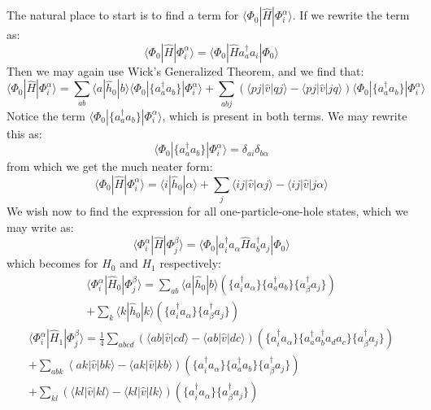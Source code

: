 \documentclass{article}
\begin{document}
\section{}
The natural place to start is to find a term for $\langle \Phi_0 | \hat H | \Phi_i^\alpha \rangle$. If we rewrite the term as:
\begin{equation*}
    \langle \Phi_0 | \hat H | \Phi_i^\alpha \rangle = \langle \Phi_0 | \hat H a_a^\dagger a_i | \Phi_0 \rangle
\end{equation*}
Then we may again use Wick's Generalized Theorem, and we find that:
\begin{equation*}
    \langle \Phi_0 | \hat H | \Phi_i^\alpha \rangle = \sum_{ab} \langle a | \hat h_0 | b \rangle \langle \Phi_0 | \{ a_a^\dagger a_b \} | \Phi_i^\alpha \rangle + \sum_{abj} (\langle pj | \hat v | q j \rangle - \langle pj | \hat v | jq \rangle) \langle \Phi_0 | \{ a_a^\dagger a_b \} | \Phi_i^\alpha \rangle
\end{equation*}
Notice the term $\langle \Phi_0 | \{ a_a^\dagger a_b \} | \Phi_i^\alpha \rangle$, which is present in both terms. We may rewrite this as:
\begin{equation*}
    \langle \Phi_0 | \{ a_a^\dagger a_b \} | \Phi_i^\alpha \rangle = \delta_{ai} \delta_{b \alpha}
\end{equation*}
from which we get the much neater form:
\begin{equation}
    \langle \Phi_0 | \hat H | \Phi_i^\alpha \rangle = \langle i | \hat h_0 | \alpha \rangle + \sum_j \langle ij | \hat v | \alpha j \rangle - \langle ij | \hat v | j \alpha \rangle
\end{equation}
We wish now to find the expression for all one-particle-one-hole states, which we may write as:
\begin{equation*}
    \langle \Phi_i^\alpha | \hat H | \Phi_j^\beta \rangle = \langle \Phi_0 | a_i^\dagger a_\alpha \hat H a_b^\dagger a_j | \Phi_0 \rangle
\end{equation*}
which becomes for $H_0$ and $H_1$ respectively:
\begin{gather*}
    \langle \Phi_i^\alpha | \hat H_0 | \Phi_j^\beta \rangle = \sum_{ab} \langle a | \hat h_0 | b \rangle \left(\{a_i^\dagger a_\alpha \} \{a_a^\dagger a_b \} \{a_\beta^\dagger a_j \} \right) \\ 
    + \sum_k \langle k | \hat h_0 | k \rangle \left(\{a_i^\dagger a_\alpha \} \{a_\beta^\dagger a_j \} \right)
\end{gather*}
\begin{gather*}
    \langle \Phi_i^\alpha | \hat H_1 | \Phi_j^\beta \rangle = \frac{1}{4} \sum_{abcd} \left(\langle ab | \hat v | cd \rangle - \langle ab | \hat v | dc \rangle \right) \left(\{a_i^\dagger a_\alpha \} \{a_a^\dagger a_b^\dagger a_d a_c \} \{a_\beta^\dagger a_j \} \right) \\
    + \sum_{abk} \left\langle a k | \hat v | b k \rangle - \langle a k | \hat v | k b \rangle \right) \left(\{a_i^\dagger a_\alpha \} \{a_a^\dagger a_b \} \{a_\beta^\dagger a_j \} \right) \\
    + \sum_{kl} \left(\langle kl | \hat v | kl \rangle - \langle kl | \hat v | lk \rangle \right) \left(\{a_i^\dagger a_\alpha \} \{a_\beta^\dagger a_j \} \right)
\end{gather*}
\end{document}
